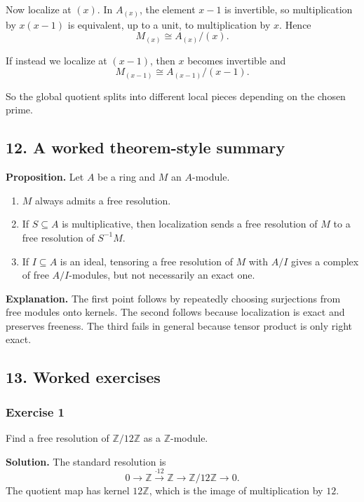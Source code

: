 \documentclass[12pt,a4paper]{article}
\theoremstyle{notespace}
\theoremstyle{definition}
\begin{document}
Now localize at \((x)\). In \(A_{(x)}\), the element \(x-1\) is invertible, so multiplication by \(x(x-1)\) is equivalent, up to a unit, to multiplication by \(x\). Hence
\[
M_{(x)} \cong A_{(x)}/(x).
\]

If instead we localize at \((x-1)\), then \(x\) becomes invertible and
\[
M_{(x-1)} \cong A_{(x-1)}/(x-1).
\]

So the global quotient splits into different local pieces depending on the chosen prime.

\subsection{12. A worked theorem-style summary}

\textbf{Proposition.}
Let \(A\) be a ring and \(M\) an \(A\)-module.

\begin{enumerate}
	\item \(M\) always admits a free resolution.
	\item If \(S\subseteq A\) is multiplicative, then localization sends a free resolution of \(M\) to a free resolution of \(S^{-1}M\).
	\item If \(I\subseteq A\) is an ideal, tensoring a free resolution of \(M\) with \(A/I\) gives a complex of free \(A/I\)-modules, but not necessarily an exact one.
\end{enumerate}

\textbf{Explanation.}
The first point follows by repeatedly choosing surjections from free modules onto kernels.
The second follows because localization is exact and preserves freeness.
The third fails in general because tensor product is only right exact.

\subsection{13. Worked exercises}

\subsubsection*{Exercise 1}
Find a free resolution of \(\mathbb Z/12\mathbb Z\) as a \(\mathbb Z\)-module.

\textbf{Solution.}
The standard resolution is
\[
0 \longrightarrow \mathbb Z \xrightarrow{\cdot 12} \mathbb Z \longrightarrow \mathbb Z/12\mathbb Z \longrightarrow 0.
\]
The quotient map has kernel \(12\mathbb Z\), which is the image of multiplication by \(12\).
\end{document}
